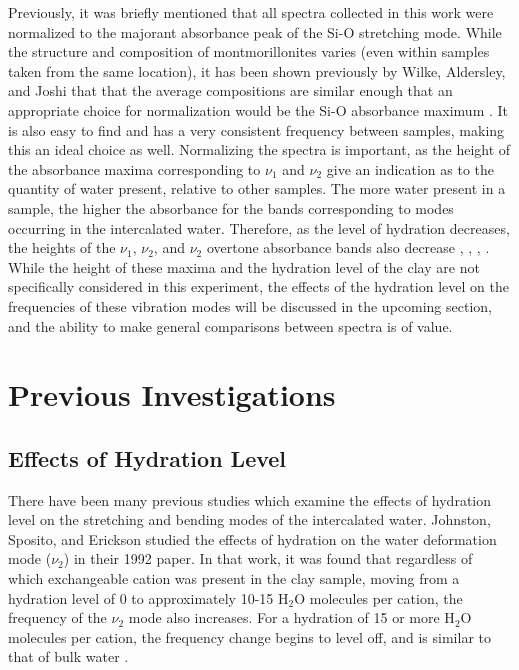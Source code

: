 Previously, it was briefly mentioned that all spectra collected in this work were normalized to the majorant absorbance peak of the Si-O stretching mode. While the structure and composition of montmorillonites varies (even within samples taken from the same location), it has been shown previously by Wilke, Aldersley, and Joshi that that the average compositions are similar enough that an appropriate choice for normalization would be the Si-O absorbance maximum \cite{wilke2016}. It is also easy to find and has a very consistent frequency between samples, making this an ideal choice as well. Normalizing the spectra is important, as the height of the absorbance maxima corresponding to $\nu_1$ and $\nu_2$ give an indication as to the quantity of water present, relative to other samples. The more water present in a sample, the higher the absorbance for the bands corresponding to modes occurring in the intercalated water. Therefore, as the level of hydration decreases, the heights of the $\nu_1$, $\nu_2$, and $\nu_2$ overtone absorbance bands also decrease \cite{madejova2003ftir}, \cite{bishop1994infrared}, \cite{johnston1992vibrational}, \cite{xu2000infrared}. While the height of these maxima and the hydration level of the clay are not specifically considered in this experiment, the effects of the hydration level on the frequencies of these vibration modes will be discussed in the upcoming section, and the ability to make general comparisons between spectra is of value.


\section{Previous Investigations}
\subsection{Effects of Hydration Level}
There have been many previous studies which examine the effects of hydration level on the stretching and bending modes of the intercalated water. Johnston, Sposito, and Erickson studied the effects of hydration on the water deformation mode ($\nu_2$) in their 1992 paper. In that work, it was found that regardless of which exchangeable cation was present in the clay sample, moving from a hydration level of 0 to approximately 10-15 H$_2$O molecules per cation, the frequency of the $\nu_2$ mode also increases. For a hydration of 15 or more H$_2$O molecules per cation, the frequency change begins to level off, and is similar to that of bulk water \cite{johnston1992vibrational}.

